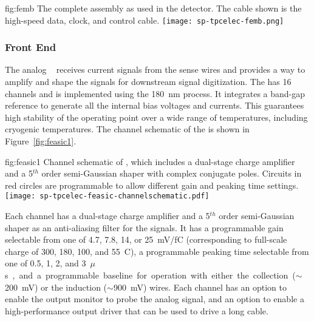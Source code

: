\begin{dunefigure}
{fig:femb}
{The complete  assembly as used in the  
detector. The cable shown is the high-speed data, clock, and control cable.}
\texttt{[image: sp-tpcelec-femb.png]}
\end{dunefigure}

\subsubsection{Front End }
\label{sec:fdsp-tpcelec-design-femb-fe}

The analog  ~\cite{DeGeronimo:2011zz} receives 
current signals from the  sense wires and provides a way to 
amplify and shape the signals for downstream signal digitization. 
The   has \num{16} channels and is implemented 
using the  \SI{180}{nm}  process. It 
integrates a band-gap reference to generate all the internal bias 
voltages and currents. This guarantees high stability of the operating 
point over a wide range of temperatures, including cryogenic temperatures. 
The channel schematic of the   is shown in 
Figure~\ref{fig:feasic1}. 

\begin{dunefigure}
{fig:feasic1}
{Channel schematic of  , which includes a 
dual-stage charge amplifier and a \num{5}$^{th}$ order semi-Gaussian 
shaper with complex conjugate poles. Circuits in red circles are 
programmable to allow different gain and peaking time settings.}
\texttt{[image: sp-tpcelec-feasic-channelschematic.pdf]}
\end{dunefigure}

Each   channel has a dual-stage charge amplifier 
and a \num{5}$^{th}$ order semi-Gaussian shaper as an anti-aliasing 
filter for the  signals. It has a programmable gain 
selectable from one of \num{4.7}, \num{7.8}, \num{14}, or \SI{25}{mV/fC}
(corresponding to full-scale charge of \num{300}, \num{180}, \num{100}, 
and \SI{55}{C}), a programmable peaking time selectable from one of 
\num{0.5}, \num{1}, \num{2}, and \SI{3}{$\mu$s}, and a programmable 
baseline for operation with either the collection ($\sim$\SI{200}{mV}) 
or the induction ($\sim$\SI{900}{mV}) wires. Each channel has an 
option to enable the output monitor to probe the analog signal, and 
an option to enable a high-performance output driver that can be 
used to drive a long cable. 

